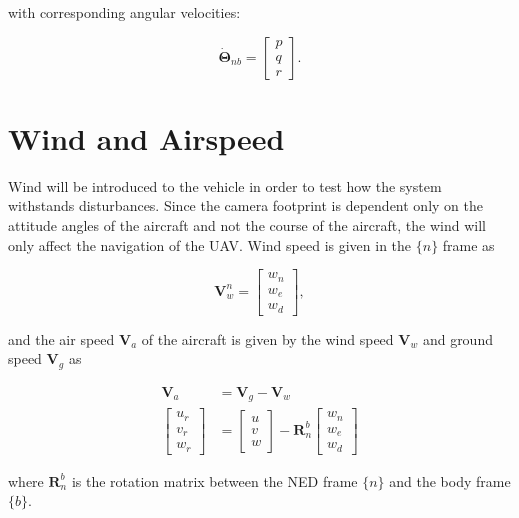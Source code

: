 with corresponding angular velocities:

\begin{equation}
	\dot{\bm{\Theta}}_{nb} =
	\begin{bmatrix}
		p \\ q \\ r
	\end{bmatrix}.
\end{equation}


\section{Wind and Airspeed}
Wind will be introduced to the vehicle in order to test how the system withstands disturbances. Since the camera footprint is dependent only on the attitude angles of the aircraft and not the course of the aircraft, the wind will only affect the navigation of the UAV. Wind speed is given in the $\{n\}$ frame as \cite{uavBEARD}

\begin{equation}
	\mathbf{V}^n_w =
	\begin{bmatrix}
		w_n \\ w_e \\ w_d
	\end{bmatrix},
\end{equation}

and the air speed $\mathbf{V}_a$ of the aircraft is given by the wind speed $\mathbf{V}_w$ and ground speed $\mathbf{V}_g$ as

\begin{equation}
\begin{split}
	\mathbf{V}_a & = \mathbf{V}_g - \mathbf{V}_w\\
	\begin{bmatrix}
		u_r \\ v_r \\ w_r
	\end{bmatrix}
	& =
	\begin{bmatrix}
		u \\ v \\ w
	\end{bmatrix}
	- \mathbf{R}_n^b
	\begin{bmatrix}
		w_n \\ w_e \\ w_d
	\end{bmatrix}
\end{split}
\end{equation}

where $\mathbf{R}_n^b$ is the rotation matrix between the NED frame $\{n\}$ and the body frame $\{b\}$. 

